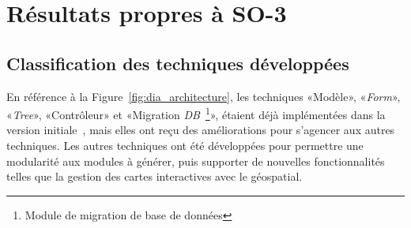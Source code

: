 \section{Résultats propres à SO-3}

\subsection{Classification des techniques développées}\label{result_technique_developpe}

En référence à la Figure~\ref{fig:dia_architecture}, les techniques «Modèle», «\textit{Form}», «\textit{Tree}», «Contrôleur» et «Migration \textit{DB}~\footnote{Module de migration de base de données}», étaient déjà implémentées dans la version initiale~\cite{bluiksnot_repo}, mais elles ont reçu des améliorations pour s’agencer aux autres techniques. Les autres techniques ont été développées pour permettre une modularité aux modules à générer, puis supporter de nouvelles fonctionnalités telles que la gestion des cartes interactives avec le géospatial.


